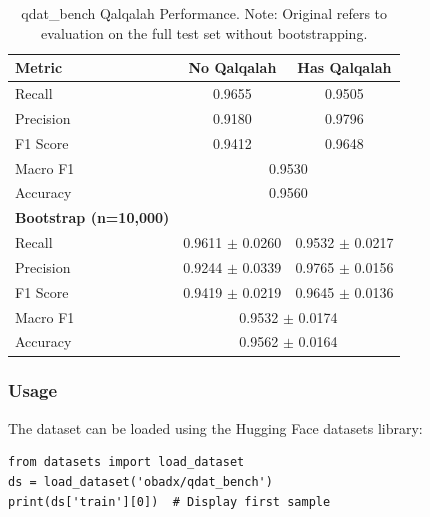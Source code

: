 \begin{table}[t]
	\centering
	\begin{tabular}{lcc}
		\hline
		\textbf{Metric}               & \textbf{No Qalqalah}                    & \textbf{Has Qalqalah} \\
		\hline
		Recall                        & 0.9655                                  & 0.9505                \\
		Precision                     & 0.9180                                  & 0.9796                \\
		F1 Score                      & 0.9412                                  & 0.9648                \\
		Macro F1                      & \multicolumn{2}{c}{0.9530}                                      \\
		Accuracy                      & \multicolumn{2}{c}{0.9560}                                      \\
		\hline
		\textbf{Bootstrap (n=10,000)} & \textbf{}                               & \textbf{}             \\
		Recall                        & 0.9611 $\pm$ 0.0260                     & 0.9532 $\pm$ 0.0217   \\
		Precision                     & 0.9244 $\pm$ 0.0339                     & 0.9765 $\pm$ 0.0156   \\
		F1 Score                      & 0.9419 $\pm$ 0.0219                     & 0.9645 $\pm$ 0.0136   \\
		Macro F1                      & \multicolumn{2}{c}{0.9532 $\pm$ 0.0174}                         \\
		Accuracy                      & \multicolumn{2}{c}{0.9562 $\pm$ 0.0164}                         \\
		\hline
	\end{tabular}
	\caption{qdat\_bench Qalqalah Performance. Note: Original refers to evaluation on the full test set without bootstrapping.}
	\label{tab:qdat_qalqalah}
\end{table}

\subsubsection{Usage}
The dataset can be loaded using the Hugging Face datasets library:

\begin{verbatim}
from datasets import load_dataset
ds = load_dataset('obadx/qdat_bench')
print(ds['train'][0])  # Display first sample
\end{verbatim}
